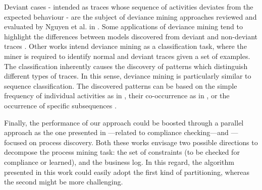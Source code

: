 Deviant cases - intended as traces whose sequence of activities deviates from the expected behaviour - are the subject of deviance mining approaches reviewed and evaluated by Nguyen et al. in \cite{2016-Nguyen}. Some applications of deviance mining tend to highlight the differences between models discovered from deviant and non-deviant traces \cite{2014-Suriadi,2014-Armas}. Other works intend deviance mining as a classification task, where the miner is required to identify normal and deviant traces given a set of examples. The classification inherently causes the discovery of patterns which distinguish different types of traces. In this sense, deviance mining is particularly similar to sequence classification. The discovered patterns can be based on the simple frequency of individual activities as in \cite{2013-Suriadi,2015-Partington}, their co-occurrence as in \cite{2011-Swinnen}, or the occurrence of specific subsequences \cite{2013-Bose,2007-Lo,2016-Bernardi}.
 
 
Finally, the performance of our approach could be boosted through a parallel approach as the one presented in \cite{2018-Loreti}---related to compliance checking---and \cite{2018a-Maggi}---focused on process discovery. Both these works envisage two possible directions to decompose the process mining task: the set of constraints (to be checked for compliance or learned), and the business log. In this regard, the algorithm presented in this work could easily adopt the first kind of partitioning, whereas the second might be more challenging.

%
%
%

